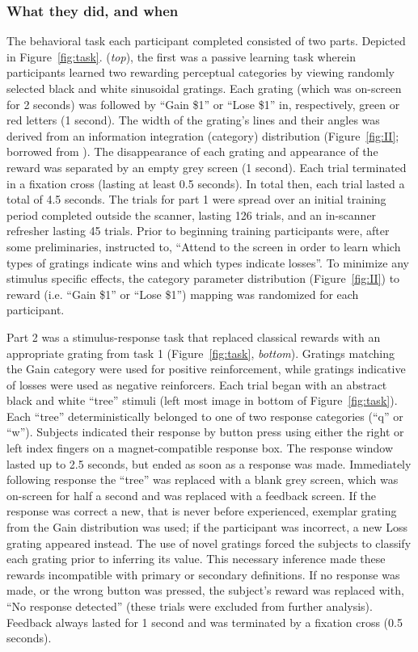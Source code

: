 \documentclass[doc,12pt]{apa}        %
\begin{document}
\subsubsection{What they did, and when}
\label{subsub:whatwhen}
The behavioral task each participant completed consisted of two parts.  Depicted in Figure~\ref{fig:task}. (\emph{top}), the first was a passive learning task wherein participants learned two rewarding perceptual categories by viewing randomly selected black and white sinusoidal gratings.  Each grating (which was on-screen for 2 seconds) was followed by ``Gain \$1'' or ``Lose \$1'' in, respectively, green or red letters (1 second).  The width of the grating's lines and their angles was derived from an information integration (category) distribution (Figure~\ref{fig:II}; borrowed from ).  The disappearance of each grating and appearance of the reward was separated by an empty grey screen (1 second).  Each trial terminated in a fixation cross (lasting at least 0.5 seconds). In total then, each trial lasted a total of 4.5 seconds.  The trials for part 1 were spread over an initial training period completed outside the scanner, lasting 126 trials, and an in-scanner refresher lasting 45 trials.  Prior to beginning training participants were, after some preliminaries, instructed to, ``Attend to the screen in order to learn which types of gratings indicate wins and which types indicate losses''.  To minimize any stimulus specific effects, the category parameter distribution (Figure~\ref{fig:II}) to reward (i.e. ``Gain \$1'' or ``Lose \$1'') mapping was randomized for each participant.

Part 2 was a stimulus-response task that replaced classical rewards with an appropriate grating from task 1 (Figure~\ref{fig:task}, \emph{bottom}).  Gratings matching the Gain category were used for positive reinforcement, while gratings indicative of losses were used as negative reinforcers.   Each trial began with an abstract black and white ``tree'' stimuli (left most image in bottom of Figure~\ref{fig:task}).  Each ``tree'' deterministically belonged to one of two response categories (``q'' or ``w'').  Subjects indicated their response by button press using either the right or left index fingers on a magnet-compatible response box.  The response window lasted up to 2.5 seconds, but ended as soon as a response was made.  Immediately following response the ``tree'' was replaced with a blank grey screen, which was on-screen for half a second and was replaced with a feedback screen.  If the response was correct a new, that is never before experienced, exemplar grating from the Gain distribution was used; if the participant was incorrect, a new Loss grating appeared instead.  The use of novel gratings forced the subjects to classify each grating prior to inferring its value.  This necessary inference made these rewards incompatible with primary or secondary definitions.  If no response was made, or the wrong button was pressed, the subject's reward was replaced with, ``No response detected'' (these trials were excluded from further analysis).  Feedback always lasted for 1 second and was terminated by a fixation cross (0.5 seconds).  
\end{document}
